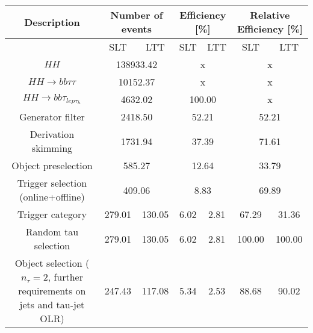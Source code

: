  \begin{landscape}
     \begin{table}
     \centering
 \begin{tabular}{|c|cc|cc|cc|}
     \hline
     Description & \multicolumn{2}{c|}{Number of events} & \multicolumn{2}{c|}{Efficiency [\%]} & \multicolumn{2}{c|}{Relative Efficiency [\%] }\\
     \hline
     & SLT & LTT & SLT &  LTT &  SLT &  LTT \\
     \hline
$HH$                                                                          &  \multicolumn{2}{c|}{138933.42} & 	 \multicolumn{2}{c|}{x} &  \multicolumn{2}{c|}{x}\\
$HH\rightarrow bb\tau\tau$                                                                        &  \multicolumn{2}{c|}{10152.37} &  \multicolumn{2}{c|}{x} &  \multicolumn{2}{c|}{x} \\
$HH\rightarrow bb\tau_{lep\tau_{h}}$                                                                        &  \multicolumn{2}{c|}{4632.02} & 		 \multicolumn{2}{c|}{100.00} &     \multicolumn{2}{c|}{x} \\
Generator filter                                                                          &  \multicolumn{2}{c|}{2418.50} & 		 \multicolumn{2}{c|}{52.21} & 		 \multicolumn{2}{c|}{52.21}\\
Derivation skimming                                                                       &  \multicolumn{2}{c|}{1731.94} & 		 \multicolumn{2}{c|}{37.39} & 		 \multicolumn{2}{c|}{71.61}\\
Object preselection                                                                       &  \multicolumn{2}{c|}{585.27} & 		 \multicolumn{2}{c|}{12.64} & 		 \multicolumn{2}{c|}{33.79} \\
\hline
Trigger selection (online+offline)                                                                        &  \multicolumn{2}{c|}{409.06} & 		 \multicolumn{2}{c|}{8.83} &  		 \multicolumn{2}{c|}{69.89}\\
Trigger category                                                                          & 279.01 & 	130.05 &    	6.02 &	2.81 &	67.29 &	31.36 \\
\hline
Random tau selection                                                                          & 279.01 & 	130.05 &    	6.02 &	2.81 &	100.00 &	100.00 \\
Object selection ($n_\tau=2$, further requirements on jets and tau-jet OLR)               & 247.43 & 	117.08 &    	5.34 &	2.53 &	88.68 &	90.02 \\

\end{tabular}
\end{table}
\end{landscape}
